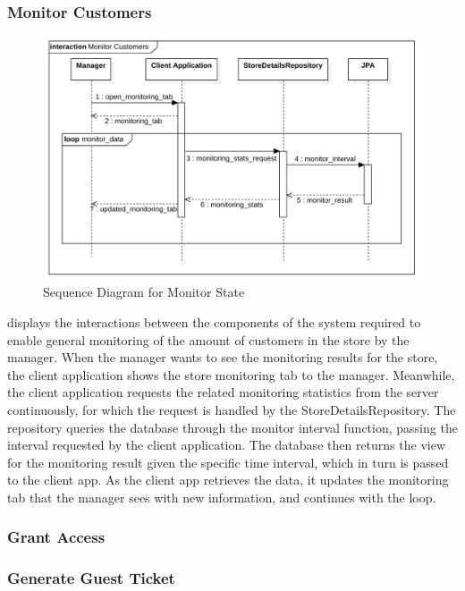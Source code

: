 \subsubsection{Monitor Customers}
\begin{figure}[H]
    \centering
    \includegraphics[height=0.4\textwidth]{Images/SequenceDiagrams/MonitorState.png}
    \caption{Sequence Diagram for Monitor State}
    \label{fig:SDMonitorState}
\end{figure}
 displays the interactions between the components of the system required to enable general monitoring of the amount of customers in the store by the manager.
When the manager wants to see the monitoring results for the store, the client application shows the store monitoring tab to the manager.
Meanwhile, the client application requests the related monitoring statistics from the server continuously, for which the request is handled by the StoreDetailsRepository.
The repository queries the database through the monitor interval function, passing the interval requested by the client application.
The database then returns the view for the monitoring result given the specific time interval, which in turn is passed to the client app.
As the client app retrieves the data, it updates the monitoring tab that the manager sees with new information, and continues with the loop.

\subsubsection{Grant Access} %
\subsubsection{Generate Guest Ticket} %


